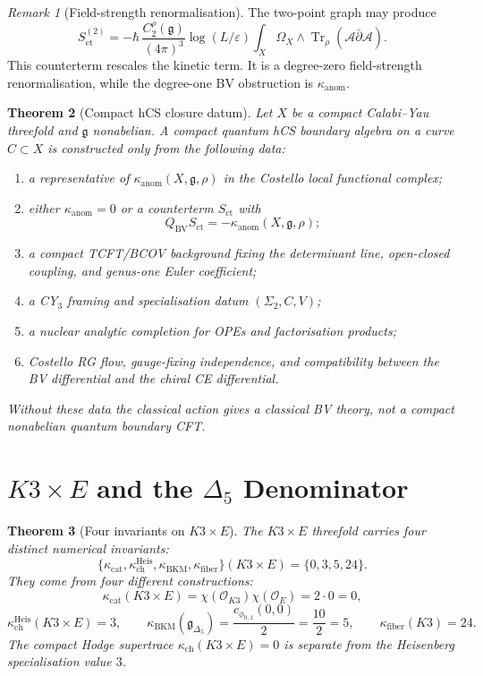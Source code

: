 \documentclass[11pt]{article}
\newtheorem{theorem}{Theorem}
\theoremstyle{definition}
\theoremstyle{remark}
\newtheorem{remark}[theorem]{Remark}
\newcommand{\fg}{\mathfrak{g}}
\newcommand{\BV}{\mathrm{BV}}
\newcommand{\Tr}{\operatorname{Tr}}
\newcommand{\kcat}{\kappa_{\mathrm{cat}}}
\newcommand{\kch}{\kappa_{\mathrm{ch}}}
\newcommand{\kBKM}{\kappa_{\mathrm{BKM}}}
\newcommand{\kfib}{\kappa_{\mathrm{fiber}}}
\begin{document}
\begin{remark}[Field-strength renormalisation]
\label{rem:field-strength-vs-anomaly}
The two-point graph may produce
\[
  S_{\mathrm{ct}}^{(2)}
  =
  -\hbar\,\frac{C_2^\rho(\fg)}{(4\pi)^3}
  \log(L/\varepsilon)
  \int_X\Omega_X\wedge
  \Tr_\rho(\mathcal A\bar\partial\mathcal A).
\]
This counterterm rescales the kinetic term. It is a degree-zero
field-strength renormalisation, while the degree-one BV obstruction is
\(\kappa_{\mathrm{anom}}\).
\end{remark}

\begin{theorem}[Compact hCS closure datum]
\label{thm:compact-hcs-closure-datum}
Let \(X\) be a compact Calabi--Yau threefold and \(\fg\) nonabelian.
A compact quantum hCS boundary algebra on a curve \(C\subset X\) is
constructed only from the following data:
\begin{enumerate}[label=\textup{(\roman*)}]
\item a representative of \(\kappa_{\mathrm{anom}}(X,\fg,\rho)\) in the
Costello local functional complex;
\item either \(\kappa_{\mathrm{anom}}=0\) or a counterterm
\(S_{\mathrm{ct}}\) with
\[
  Q_{\BV}S_{\mathrm{ct}}=-\kappa_{\mathrm{anom}}(X,\fg,\rho);
\]
\item a compact TCFT/BCOV background fixing the determinant line,
open-closed coupling, and genus-one Euler coefficient;
\item a CY\(_3\) framing and specialisation datum \((\Sigma_2,C,V)\);
\item a nuclear analytic completion for OPEs and factorisation products;
\item Costello RG flow, gauge-fixing independence, and compatibility
between the BV differential and the chiral CE differential.
\end{enumerate}
Without these data the classical action gives a classical BV theory, not
a compact nonabelian quantum boundary CFT.
\end{theorem}

\section{\texorpdfstring{$K3\times E$}{K3 x E} and the
\texorpdfstring{$\Delta_5$}{Delta5} Denominator}
\label{sec:k3e-denominator}

\begin{theorem}[Four invariants on \(K3\times E\)]
\label{thm:k3e-four-invariants}
The \(K3\times E\) threefold carries four distinct numerical invariants:
\[
  \{\kcat,\kappa_{\mathrm{ch}}^{\mathrm{Heis}},\kBKM,\kfib\}
  (K3\times E)
  =
  \{0,3,5,24\}.
\]
They come from four different constructions:
\[
  \kcat(K3\times E)
  =
  \chi(\mathcal O_{K3})\chi(\mathcal O_E)
  =
  2\cdot 0=0,
\]
\[
  \kappa_{\mathrm{ch}}^{\mathrm{Heis}}(K3\times E)=3,
  \qquad
  \kBKM(\fg_{\Delta_5})=
  \frac{c_{\phi_{0,1}}(0,0)}{2}=\frac{10}{2}=5,
  \qquad
  \kfib(K3)=24.
\]
The compact Hodge supertrace \(\kch(K3\times E)=0\) is separate from
the Heisenberg specialisation value \(3\).
\end{theorem}
\end{document}
